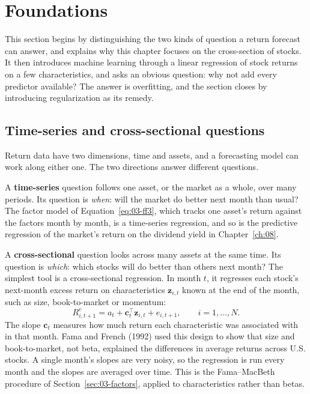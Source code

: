 \section{Foundations}
\label{sec:19-foundations}

This section begins by distinguishing the two kinds of question a return forecast can answer, and explains why this chapter focuses on the cross-section of stocks. It then introduces machine learning through a linear regression of stock returns on a few characteristics, and asks an obvious question: why not add every predictor available? The answer is overfitting, and the section closes by introducing regularization as its remedy.

\subsection{Time-series and cross-sectional questions}
\label{sec:19-crosssection}

Return data have two dimensions, time and assets, and a forecasting model can work along either one. The two directions answer different questions.

A \textbf{time-series} question follows one asset, or the market as a whole, over many periods. Its question is \emph{when}: will the market do better next month than usual? The factor model of Equation~\eqref{eq:03-ff3}, which tracks one asset's return against the factors month by month, is a time-series regression, and so is the predictive regression of the market's return on the dividend yield in Chapter~\ref{ch:08}.

A \textbf{cross-sectional} question looks across many assets at the same time. Its question is \emph{which}: which stocks will do better than others next month? The simplest tool is a cross-sectional regression. In month $t$, it regresses each stock's next-month excess return on characteristics $\mathbf{z}_{i,t}$ known at the end of the month, such as size, book-to-market or momentum:
\begin{equation}
  R^{e}_{i,t+1} = a_t + \mathbf{c}_t^{\top} \mathbf{z}_{i,t} + e_{i,t+1}, \qquad i = 1, \dots, N.
  \label{eq:19-xs}
\end{equation}
The slope $\mathbf{c}_t$ measures how much return each characteristic was associated with in that month. Fama and French (1992) used this design to show that size and book-to-market, not beta, explained the differences in average returns across U.S. stocks. A single month's slopes are very noisy, so the regression is run every month and the slopes are averaged over time. This is the Fama--MacBeth procedure of Section~\ref{sec:03-factors}, applied to characteristics rather than betas.

